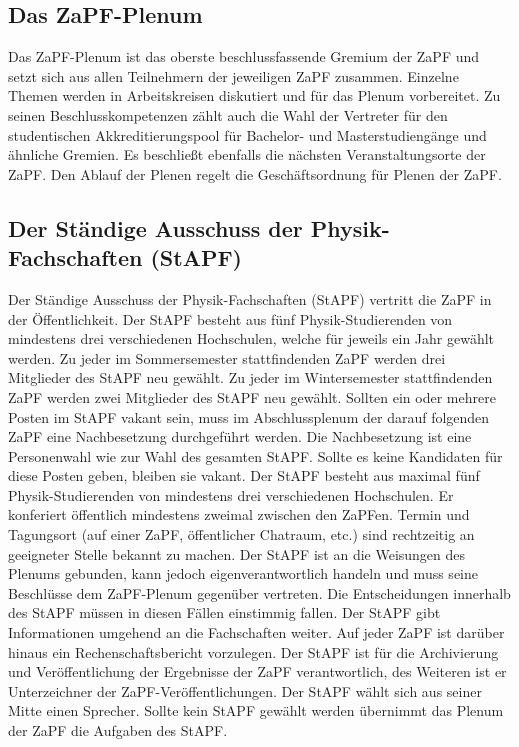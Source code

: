 \documentclass[draft,12pt,oneside]{scrreprt}
\begin{document}
\subsection{Das ZaPF-Plenum}

          Das ZaPF-Plenum ist das oberste beschlussfassende Gremium der ZaPF
          und setzt sich aus allen Teilnehmern der jeweiligen ZaPF zusammen.
          Einzelne Themen werden in Arbeitskreisen diskutiert und für das
          Plenum vorbereitet. Zu seinen Beschlusskompetenzen zählt auch die
          Wahl der Vertreter für den studentischen Akkreditierungspool für
          Bachelor- und Masterstudiengänge und ähnliche Gremien.  Es beschließt
          ebenfalls die nächsten Veranstaltungsorte der ZaPF.  Den Ablauf der
          Plenen regelt die Geschäftsordnung für Plenen der ZaPF.

\subsection{Der Ständige Ausschuss der Physik-Fachschaften (StAPF)}

          Der Ständige Ausschuss der Physik-Fachschaften (StAPF) vertritt die
          ZaPF in der Öffentlichkeit. Der StAPF besteht aus fünf Physik-Studierenden
          von mindestens drei verschiedenen Hochschulen, welche für jeweils ein
          Jahr gewählt werden. Zu jeder im Sommersemester stattfindenden ZaPF
          werden drei Mitglieder des StAPF neu gewählt. Zu jeder im Wintersemester
          stattfindenden ZaPF werden zwei Mitglieder des StAPF neu gewählt.
          Sollten ein oder mehrere Posten im StAPF vakant sein, muss im
          Abschlussplenum der darauf folgenden ZaPF eine Nachbesetzung
          durchgeführt werden. Die Nachbesetzung ist eine Personenwahl wie zur
          Wahl des gesamten StAPF. Sollte es keine Kandidaten für diese Posten
          geben, bleiben sie vakant. Der StAPF besteht aus maximal fünf
          Physik-Studierenden von mindestens drei verschiedenen Hochschulen.
          Er konferiert öffentlich mindestens zweimal zwischen den ZaPFen.
          Termin und Tagungsort (auf einer ZaPF, öffentlicher Chatraum, etc.)
          sind rechtzeitig an geeigneter Stelle bekannt zu machen. Der StAPF ist
          an die Weisungen des Plenums gebunden, kann jedoch eigenverantwortlich
          handeln und muss seine Beschlüsse dem ZaPF-Plenum gegenüber vertreten.
          Die Entscheidungen innerhalb des StAPF müssen in diesen Fällen einstimmig
          fallen. Der StAPF gibt Informationen umgehend an die Fachschaften weiter.
          Auf jeder ZaPF ist darüber hinaus ein Rechenschaftsbericht vorzulegen.
          Der StAPF ist für die Archivierung und Veröffentlichung der Ergebnisse
          der ZaPF verantwortlich, des Weiteren ist er Unterzeichner der
          ZaPF-Veröffentlichungen. Der StAPF wählt sich aus seiner Mitte einen
          Sprecher. Sollte kein StAPF gewählt werden übernimmt das Plenum der
          ZaPF die Aufgaben des StAPF.
\end{document}
